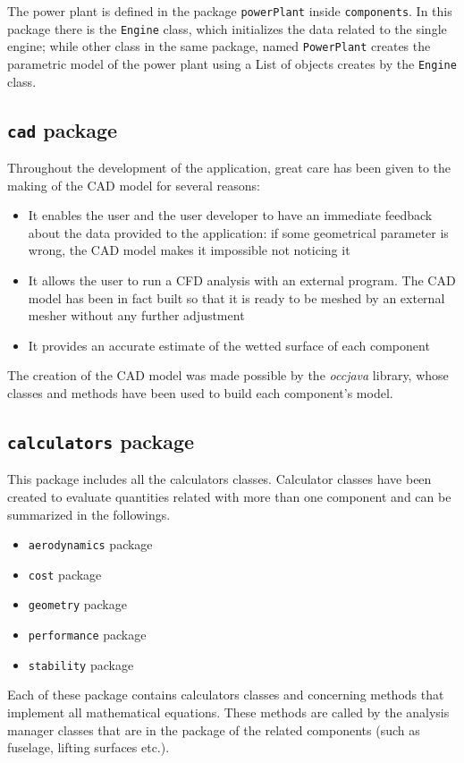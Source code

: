 \bigskip
\noindent
The power plant is defined in the package \lstinline[language=Java]!powerPlant! inside \lstinline[language=Java]!components!. In this package there is the \lstinline[language=Java]!Engine! class, which initializes the data related to the single engine; while other class in the same package, named \lstinline[language=Java]!PowerPlant! creates the parametric model of the power plant using a \gls{List}\cite{listAPI} of objects creates by the \lstinline[language=Java]!Engine! class.
%
\subsection{\texttt{cad} package}
Throughout the development of the application, great care has been given to the making of the CAD model for several reasons:
%
\begin{itemize}
	\item It enables the user and the user developer to have an immediate feedback about the data provided to the application: if some geometrical parameter is wrong, the CAD model makes it impossible not noticing it
	\item It allows the user to run a CFD analysis with an external program. The CAD model has been in fact built so that it is ready to be meshed by an external mesher without any further adjustment
	\item It provides an accurate estimate of the wetted surface of each component
\end{itemize}
%
The creation of the CAD model was made possible by the \emph{occjava} library, whose classes and methods have been used to build each component's model.
%
\subsection{\texttt{calculators} package}
This package includes all the calculators classes. Calculator classes have been created to evaluate quantities related with more than one component and can be summarized in the followings.
%
 \begin{itemize}
\item \lstinline[language=Java]!aerodynamics! package
\item \lstinline[language=Java]!cost! package
\item \lstinline[language=Java]!geometry! package
\item \lstinline[language=Java]!performance! package
\item \lstinline[language=Java]!stability! package
\end{itemize} 
%
Each of these package contains calculators classes and concerning methods that implement all mathematical equations. These methods are called by the analysis manager classes that are in the package of the related components (such as fuselage, lifting surfaces etc.).
%
